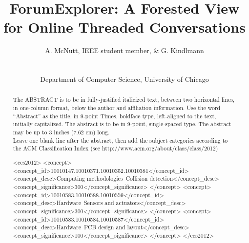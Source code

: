\documentclass{egpubl}
\title[ForumExplorer]%
      {ForumExplorer: A Forested View for Online Threaded Conversations}
\author[A. McNutt \& G. Kindlmann]
{\parbox{\textwidth}{\centering A. McNutt, IEEE student member, \& G. Kindlmann
        }
        \\
{\parbox{\textwidth}{\centering Department of Computer Science, University of Chicago
       } 
}
}
\begin{document}

\maketitle
\begin{abstract}
   The ABSTRACT is to be in fully-justified italicized text, 
   between two horizontal lines,
   in one-column format, 
   below the author and affiliation information. 
   Use the word ``Abstract'' as the title, in 9-point Times, boldface type, 
   left-aligned to the text, initially capitalized. 
   The abstract is to be in 9-point, single-spaced type.
   The abstract may be up to 3 inches (7.62 cm) long. \\
   Leave one blank line after the abstract, 
   then add the subject categories according to the ACM Classification Index 
   (see http://www.acm.org/about/class/class/2012)
\begin{CCSXML}
<ccs2012>
<concept>
<concept_id>10010147.10010371.10010352.10010381</concept_id>
<concept_desc>Computing methodologies~Collision detection</concept_desc>
<concept_significance>300</concept_significance>
</concept>
<concept>
<concept_id>10010583.10010588.10010559</concept_id>
<concept_desc>Hardware~Sensors and actuators</concept_desc>
<concept_significance>300</concept_significance>
</concept>
<concept>
<concept_id>10010583.10010584.10010587</concept_id>
<concept_desc>Hardware~PCB design and layout</concept_desc>
<concept_significance>100</concept_significance>
</concept>
</ccs2012>
\end{CCSXML}



\printccsdesc   
\end{abstract}
\end{document}
